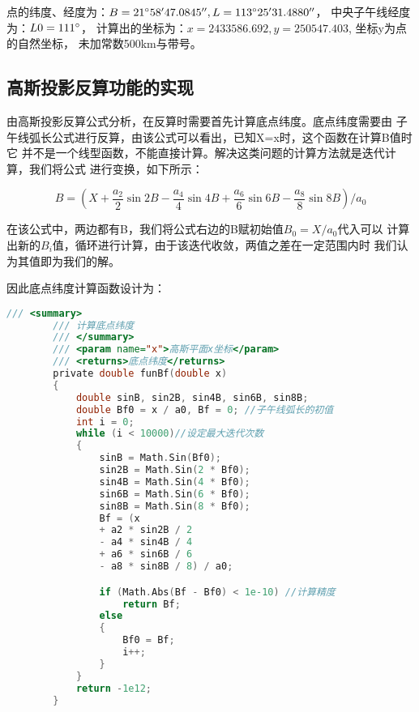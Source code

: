 点的纬度、经度为：$ B = 21 ^\circ 58'47.0845'',  L= 113^\circ 25'31.4880''$，
中央子午线经度为：$L0 = 111^\circ$，
计算出的坐标为：$x=2433586.692, y=250547.403$, 坐标y为点的自然坐标，
未加常数500km与带号。

\subsection{高斯投影反算功能的实现}
由高斯投影反算公式分析，在反算时需要首先计算底点纬度。底点纬度需要由
子午线弧长公式进行反算，由该公式可以看出，已知X=x时，这个函数在计算B值时它
并不是一个线型函数，不能直接计算。解决这类问题的计算方法就是迭代计算，我们将公式
进行变换，如下所示：

$$B= (X + \frac{a_2}{2}\sin 2B - \frac{a_4}{4}\sin 4B
+ \frac{a_6}{6} \sin 6B  - \frac{a_8}{8}\sin 8B)/a_0$$

在该公式中，两边都有B，我们将公式右边的B赋初始值$B_0=X/a_0$代入可以
计算出新的$B_i$值，循环进行计算，由于该迭代收敛，两值之差在一定范围内时
我们认为其值即为我们的解。

因此底点纬度计算函数设计为：
 \begin{lstlisting}[language=C]
        /// <summary>
        /// 计算底点纬度
        /// </summary>
        /// <param name="x">高斯平面x坐标</param>
        /// <returns>底点纬度</returns>
        private double funBf(double x)
        {
            double sinB, sin2B, sin4B, sin6B, sin8B;
            double Bf0 = x / a0, Bf = 0; //子午线弧长的初值
            int i = 0;
            while (i < 10000)//设定最大迭代次数
            {
                sinB = Math.Sin(Bf0);
                sin2B = Math.Sin(2 * Bf0);
                sin4B = Math.Sin(4 * Bf0);
                sin6B = Math.Sin(6 * Bf0);
                sin8B = Math.Sin(8 * Bf0);
                Bf = (x
                + a2 * sin2B / 2
                - a4 * sin4B / 4
                + a6 * sin6B / 6
                - a8 * sin8B / 8) / a0;

                if (Math.Abs(Bf - Bf0) < 1e-10) //计算精度
                    return Bf;
                else
                {
                    Bf0 = Bf;
                    i++;
                }
            }
            return -1e12;
        }
\end{lstlisting}

